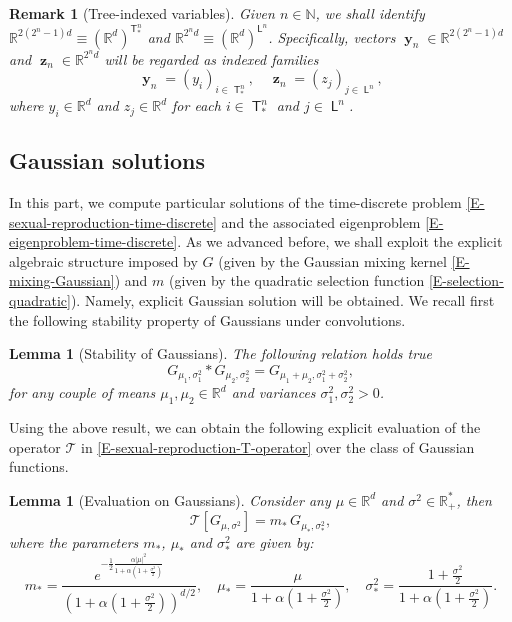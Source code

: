 \documentclass[reqno]{amsart}
\newtheorem{lemma}[definition]{Lemma}
\newtheorem{remark}[definition]{Remark}
\DeclareMathOperator{\Tree}{\mathsf{T}}
\DeclareMathOperator{\Leaves}{\mathsf{L}}
\DeclareMathOperator{\by}{\mathbf{y}}
\DeclareMathOperator{\bz}{\mathbf{z}}
\numberwithin{equation}{section}
\begin{document}
{\begin{remark}[Tree-indexed variables]\label{R-tree-indexed-variables}
Given $n\in \mathbb{N}$, we shall identify $\mathbb{R}^{2(2^n-1)d}\equiv (\mathbb{R}^d)^{\Tree^n_*}$ and $\mathbb{R}^{2^nd}\equiv (\mathbb{R}^d)^{\Leaves^n}$. Specifically, vectors $\by_n\in \mathbb{R}^{2(2^n-1)d}$ and $\bz_n\in\mathbb{R}^{2^nd}$ will be regarded as indexed families
\begin{equation}\label{E-tree-indexed-variables}
\by_n=(y_i)_{i\in \Tree^n_*},\quad \bz_n=(z_j)_{j\in \Leaves^n},
\end{equation}
where $y_i\in \mathbb{R}^d$ and $z_j\in \mathbb{R}^d$ for each $i\in \Tree^n_*$ and $j\in \Leaves^n$.
\end{remark}


\subsection{Gaussian solutions}
In this part, we compute particular solutions of the time-discrete problem \eqref{E-sexual-reproduction-time-discrete} and the associated eigenproblem \eqref{E-eigenproblem-time-discrete}. As we advanced before, we shall exploit the explicit algebraic structure imposed by $G$ (given by the Gaussian mixing kernel \eqref{E-mixing-Gaussian}) and $m$ (given by the quadratic selection function \eqref{E-selection-quadratic}). Namely, explicit Gaussian solution will be obtained. We recall first the following stability property of Gaussians under convolutions.

\begin{lemma}[Stability of Gaussians]\label{L-convolution-gaussians}
The following relation holds true
\begin{equation}\label{E-convolution-gaussians}
G_{\mu_1,\sigma_1^2}*G_{\mu_2,\sigma_2^2}=G_{\mu_1+\mu_2,\sigma_1^2+\sigma_2^2},
\end{equation}
for any couple of means $\mu_1,\mu_2\in \mathbb{R}^d$ and variances $\sigma_1^2,\sigma_2^2>0$.
\end{lemma}

Using the above result, we can obtain the following explicit evaluation of the operator $\mathcal{T}$ in \eqref{E-sexual-reproduction-T-operator} over the class of Gaussian functions.

\begin{lemma}[Evaluation on Gaussians]\label{L-evaluation-gaussians}
Consider any $\mu\in \mathbb{R}^d$ and $\sigma^2\in \mathbb{R}_+^*$, then
$$\mathcal{T}[G_{\mu,\sigma^2}]=m_*\,G_{\mu_*,\sigma_*^2},$$
where the parameters $m_*$, $\mu_*$ and $\sigma_*^2$ are given by:
\begin{equation}\label{E-evaluation-gaussians-parameters}
m_*=\frac{e^{-\frac{1}{2}\frac{\alpha\vert \mu\vert^2}{1+\alpha(1+\frac{\sigma^2}{2})}}}{(1+\alpha(1+\frac{\sigma^2}{2}))^{d/2}},\quad \mu_*=\frac{\mu}{1+\alpha(1+\frac{\sigma^2}{2})},\quad \sigma_*^2=\frac{1+\frac{\sigma^2}{2}}{1+\alpha(1+\frac{\sigma^2}{2})}.
\end{equation}
\end{lemma}

}
\end{document}
